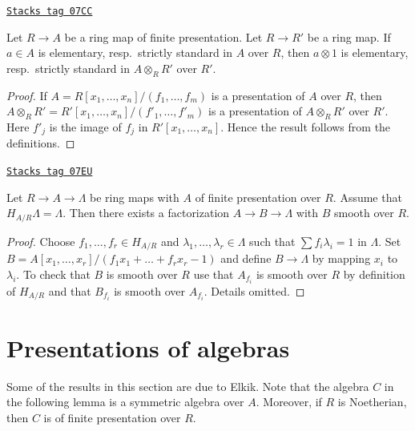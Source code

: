 \begin{lemma}
\label{smoothing-lemma-strictly-standard-base-change}
\href{https://stacks.math.columbia.edu/tag/07CC}{\texttt{Stacks tag 07CC}}

Let $R \to A$ be a ring map of finite presentation.
Let $R \to R'$ be a ring map. If $a \in A$ is elementary,
resp.\ strictly standard in $A$ over $R$, then $a \otimes 1$
is elementary, resp.\ strictly standard in $A \otimes_R R'$ over $R'$.
\end{lemma}

\begin{proof}
If $A = R[x_1, \ldots, x_n]/(f_1, \ldots, f_m)$ is a presentation
of $A$ over $R$, then
$A \otimes_R R' = R'[x_1, \ldots, x_n]/(f'_1, \ldots, f'_m)$
is a presentation of $A \otimes_R R'$ over $R'$. Here $f'_j$ is
the image of $f_j$ in $R'[x_1, \ldots, x_n]$.
Hence the result follows from the definitions.
\end{proof}

\begin{lemma}
\label{smoothing-lemma-final-solve}
\href{https://stacks.math.columbia.edu/tag/07EU}{\texttt{Stacks tag 07EU}}

Let $R \to A \to \Lambda$ be ring maps with $A$ of finite presentation
over $R$. Assume that $H_{A/R} \Lambda = \Lambda$. Then there exists
a factorization $A \to B \to \Lambda$ with $B$ smooth over $R$.
\end{lemma}

\begin{proof}
Choose $f_1, \ldots, f_r \in H_{A/R}$ and
$\lambda_1, \ldots, \lambda_r \in \Lambda$ such that
$\sum f_i\lambda_i = 1$ in $\Lambda$. Set
$B = A[x_1, \ldots, x_r]/(f_1x_1 + \ldots + f_rx_r - 1)$
and define $B \to \Lambda$ by mapping $x_i$ to $\lambda_i$.
To check that $B$ is smooth over $R$ use that $A_{f_i}$ is smooth
over $R$ by definition of $H_{A/R}$ and that $B_{f_i}$ is smooth
over $A_{f_i}$. Details omitted.
\end{proof}

\section{Presentations of algebras}
\label{smoothing-section-presentations}
Some of the results in this section are due to Elkik. Note that the algebra
$C$ in the following lemma is a symmetric algebra over $A$. Moreover, if
$R$ is Noetherian, then $C$ is of finite presentation over $R$.

